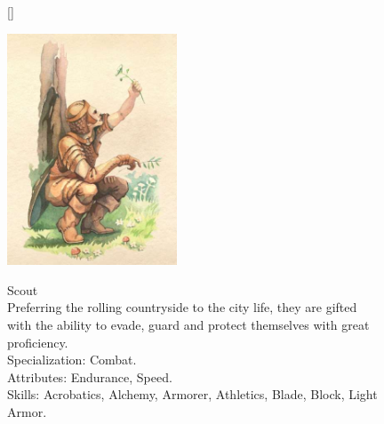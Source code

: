 \documentclass[12pt]{book}
\begin{document}
\begin{figure}[H]
[\FBwidth]
{\caption*{Scout\\

Preferring the rolling countryside to the city life, they are gifted with the ability to evade, guard and protect themselves with great proficiency.\\

Specialization: Combat.\\

Attributes: Endurance, Speed.\\

Skills: Acrobatics, Alchemy, Armorer, Athletics, Blade, Block, Light Armor.}\label{fig:test}}
{\includegraphics[width=0.45\textwidth]{Scout.png}}
\end{figure}
\end{document}
